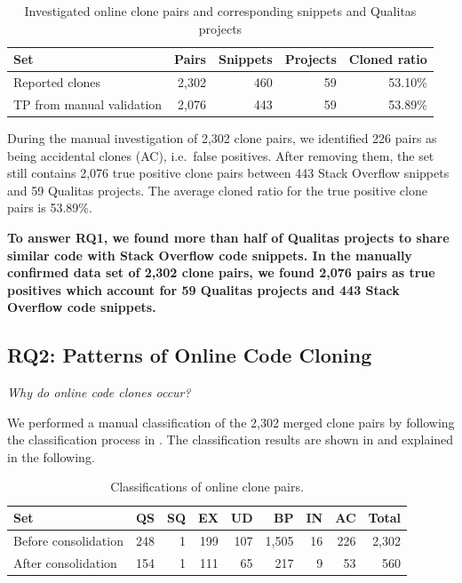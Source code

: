 \documentclass[10pt,journal,compsoc]{IEEEtran}
\newcommand\FIXME[1]{{\color{red}\textbf{FIXME: #1}}}
\begin{document}

\begin{table}
	\caption{Investigated online clone pairs and corresponding snippets
		and Qualitas projects}
	\label{tab:snippets}
	\centering
	\begin{tabular}{p{2.2cm}rrrr}
		\toprule
		Set & Pairs & Snippets & Projects & Cloned ratio \\
		\midrule
		Reported clones & 2,302 & 460 & 59 & 53.10\% \\ 
		\midrule
		TP from manual validation & 2,076 & 443 & 59 & 53.89\% \\ 
		\bottomrule
	\end{tabular}
\end{table}

During the manual investigation of 2,302 clone pairs, we identified 226 pairs
as being accidental clones (AC), i.e.~false positives. After removing
them, the set still contains 2,076 true positive clone pairs between 443 Stack
Overflow snippets and 59 Qualitas projects. The average cloned ratio for the
true positive clone pairs is 53.89\%.

\textbf{To answer RQ1, we found more than half of Qualitas projects to share
	similar code with Stack Overflow code snippets. In the manually confirmed 
	data set of 2,302 clone pairs, we found 2,076 pairs as true positives which 
	account for 59 Qualitas projects and
	443 Stack Overflow code snippets.}

\subsection{RQ2: Patterns of Online Code Cloning}
\vspace{0.25cm}
\textit{Why do online code clones occur?}
\vspace{0.25cm}

We performed a manual classification
of the 2,302 merged clone pairs by following the classification process
in . 
The classification results are shown in  
and explained in the following.

\begin{table}
	\centering
	\caption{Classifications of online clone pairs.}
	\label{tab:classification_good_o}
	\begin{tabular}{lrrrrrrrr}
		\toprule
		Set & QS & SQ & EX & UD & BP & IN & AC & Total \\ 
		\midrule
		Before consolidation & 248 & 1 & 199 & 107 & 1,505 & 16 & 226 & 2,302 \\
		After consolidation & 154 & 1 & 111 & 65 & 217 & 9 & 53 & 560 \\
		\bottomrule
	\end{tabular} 
\end{table}
\end{document}
